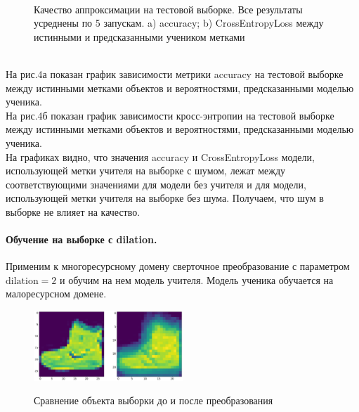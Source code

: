 \begin{figure}[h!t]\center
{}
\\
\caption{Качество аппроксимации на тестовой выборке. Все результаты усреднены по 5 запускам. a) accuracy; b) CrossEntropyLoss между истинными и предсказанными учеником метками}
\end{figure}\\
На рис.4а показан график зависимости метрики accuracy на тестовой выборке между истинными метками объектов и вероятностями, предсказанными моделью ученика.\\
На рис.4б показан график зависимости кросс-энтропии на тестовой выборке между истинными метками объектов и вероятностями, предсказанными моделью ученика.\\
На графиках видно, что значения accuracy и CrossEntropyLoss модели, использующей метки учителя на выборке с шумом, лежат между соответствующими значениями для модели без учителя и для модели, использующей метки учителя на выборке без шума. Получаем, что шум в выборке не влияет на качество.

\paragraph{Обучение на выборке с dilation.}
Применим к многоресурсному домену сверточное преобразование с параметром $\text{dilation}=2$ и обучим на нем модель учителя. Модель ученика обучается на малоресурсном домене.\\
\begin{figure}[h!t]\center
{\includegraphics[width=0.5\textwidth]{results/dilation}}
\caption{Сравнение объекта выборки до и после преобразования}
\end{figure}\\

